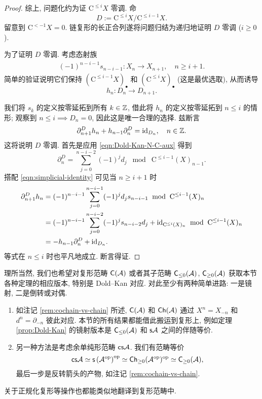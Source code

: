 \begin{proof}
	综上, 问题化约为证 $\mathrm{C}^{\leq i} X$ 零调. 命
	\[ D := \mathrm{C}^{\leq i} X / \mathrm{C}^{\leq i-1} X. \]
	留意到 $\mathrm{C}^{< -1} X = 0$. 链复形的长正合列遂将问题归结为递归地证明 $D$ 零调 ($i \geq 0$).
	
	为了证明 $D$ 零调. 考虑态射族
	\begin{gather*}
		(-1)^{n-i-1} s_{n-i-1}: X_n \to X_{n+1}, \quad n \geq i+1.
	\end{gather*}
	简单的验证说明它们保持 $(\mathrm{C}^{\leq i-1} X)_\bullet$ 和 $(\mathrm{C}^{\leq i} X)_\bullet$ (这是最优选取), 从而诱导
	\[ h_n: D_n \to D_{n+1}. \]
	
	我们将 $s_k$ 的定义按零延拓到所有 $k \in \mathbb{Z}$, 借此将 $h_n$ 的定义按零延拓到 $n \leq i$ 的情形; 观察到 $n \leq i \implies D_n = 0$, 因此这是唯一合理的选择. 兹断言
	\[ \partial^D_{n+1} h_n + h_{n-1} \partial^D_n = \mathrm{id}_{D_n}, \quad n \in \mathbb{Z}. \]
	这将说明 $D$ 零调. 首先是应用 \eqref{eqn:Dold-Kan-N-C-aux} 得到
	\[ \partial^D_n = \sum_{j=0}^{n-i-2} (-1)^j d_j \;\bmod\; \mathrm{C}^{\leq i-1}(X)_{n-1}. \]
	搭配 \eqref{eqn:simplicial-identity} 可见当 $n \geq i+1$ 时
	\begin{align*}
		\partial^D_{n+1} h_n & = (-1)^{n-i-1} \sum_{j=0}^{n-i-1} (-1)^j d_j s_{n-i-1} \; \bmod\; \mathrm{C}^{\leq i-1}(X)_n \\
		& = (-1)^{n-i-1} \sum_{j=0}^{n-i-2} (-1)^j s_{n-i-2} d_j + \mathrm{id}_{\mathrm{C}^{\leq i}(X)_n} \;\bmod\; \mathrm{C}^{\leq i-1}(X)_n \\
		& = -h_{n-1} \partial^D_n + \mathrm{id}_{D_n}.
	\end{align*}
	等式在 $n \leq i$ 时也平凡地成立. 断言得证.
\end{proof}

\begin{remark}
	理所当然, 我们也希望对复形范畴 $\mathsf{C}(\mathcal{A})$ 或者其子范畴 $\mathsf{C}_{\leq 0}(\mathcal{A})$, $\mathsf{C}_{\geq 0}(\mathcal{A})$ 获取本节各种定理的相应版本, 特别是 Dold--Kan 对应. 对此至少有两种简单进路: 一是镜射, 二是倒转或对偶.
	\begin{enumerate}
		\item 如注记 \ref{rem:cochain-vs-chain} 所述, $\mathsf{C}(\mathcal{A})$ 和 $\mathsf{Ch}(\mathcal{A})$ 通过 $X^n = X_{-n}$ 和 $d^n = \partial_{-n}$ 彼此对应. 本节的所有结果都能借此搬运到复形上, 例如定理 \ref{prop:Dold-Kan} 的镜射版本是 $\mathsf{C}_{\leq 0}(\mathcal{A})$ 和 $\mathsf{s}\mathcal{A}$ 之间的伴随等价.
		\item 另一种方法是考虑余单纯形范畴 $\mathsf{cs}\mathcal{A}$. 我们有范畴等价
		\[ \mathsf{cs}\mathcal{A} \simeq \mathsf{s}\left(\mathcal{A}^{\operatorname{op}}\right)^{\operatorname{op}} \simeq \mathsf{Ch}_{\geq 0}(\mathcal{A}^{\operatorname{op}})^{\operatorname{op}} \simeq \mathsf{C}_{\geq 0}(\mathcal{A}), \]
		最后一步是反转箭头的产物, 如注记 \ref{rem:cochain-vs-chain}.
	\end{enumerate}
	关于正规化复形等操作也都能类似地翻译到复形范畴中.
\end{remark}


